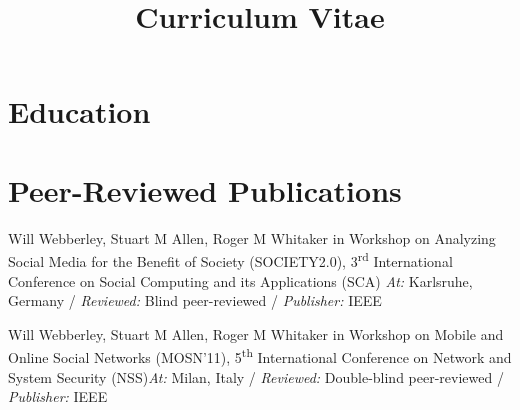 \documentclass[11pt,a4paper,sans]{moderncv} %
\title{Curriculum Vitae}
\begin{document}
\makecvtitle %


\section{Education}



\section{Peer-Reviewed Publications}
		{\newline Will Webberley, Stuart M Allen, Roger M Whitaker}
		{\newline in Workshop on Analyzing Social Media for the Benefit of Society (SOCIETY2.0), 3\textsuperscript{rd} International Conference on Social Computing and its Applications (SCA)}{}			
		{\textit{At:} Karlsruhe, Germany / \textit{Reviewed:} Blind peer-reviewed / \textit{Publisher:} IEEE}
	
	{\newline Will Webberley, Stuart M Allen, Roger M Whitaker}
	{\newline in Workshop on Mobile and Online Social Networks (MOSN'11), 5\textsuperscript{th} International Conference on Network and System Security (NSS)}{}{\textit{At:} Milan, Italy / \textit{Reviewed:} Double-blind peer-reviewed / \textit{Publisher:} IEEE}
\end{document}
